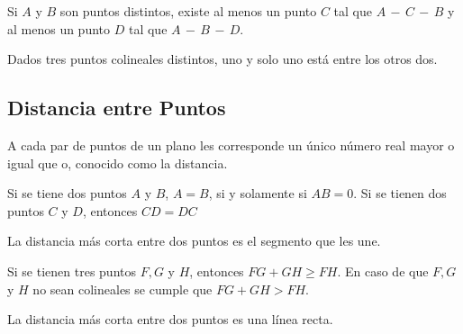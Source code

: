 \begin{postulate}
    Si $A$ y $B$ son puntos distintos, existe al menos un punto $C$ tal que $A\,-\,C\,-\,B$ y al menos un punto $D$ tal que $A\,-\,B\,-\,D$.
    
    \begin{figure}[!h]
        \centering
        
        \label{fig:postulate11}
    \end{figure}
\end{postulate}

\begin{postulate}
    Dados tres puntos colineales distintos, uno y solo uno está entre los otros dos.
    
    \begin{figure}[!h]
        \centering
        
        \label{fig:postulate12}
    \end{figure}
    
\end{postulate}

\clearpage

\subsection{Distancia entre Puntos}

\begin{postulate}
A cada par de puntos de un plano les corresponde un único número real mayor o igual que o, conocido como la distancia.
\end{postulate}

\begin{postulate}
Si se tiene dos puntos $A$ y $B$, $A = B$, si y solamente si $AB = 0$.
Si se tienen dos puntos $C$ y $D$, entonces $CD = DC$
\end{postulate}

\begin{postulate}
La distancia más corta entre dos puntos es el segmento que les une.
\end{postulate}

\begin{theorem}
    Si se tienen tres puntos $F,G$ y $H$, entonces $FG + GH \ge FH$. En caso de que $F,G$ y $H$ no sean colineales se cumple que $FG + GH > FH$.

    \begin{corolary}
    La distancia más corta entre dos puntos es una línea recta.
    \end{corolary}
    
\end{theorem}

